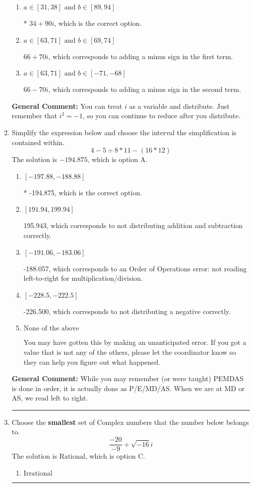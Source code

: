 \documentclass{extbook}[14pt]
\newcommand{\litem}[1]{\item #1

\rule{\textwidth}{0.4pt}}
\begin{document}
\begin{enumerate}
{\begin{enumerate}[label=\Alph*.]
 $34 - 90 i$, which corresponds to adding a minus sign in both terms.
\item \( a \in [31, 38] \text{ and } b \in [89, 94] \)

* $34 + 90 i$, which is the correct option.
\item \( a \in [63, 71] \text{ and } b \in [69, 74] \)

 $66 + 70 i$, which corresponds to adding a minus sign in the first term.
\item \( a \in [63, 71] \text{ and } b \in [-71, -68] \)

 $66 - 70 i$, which corresponds to adding a minus sign in the second term.
\end{enumerate}

\textbf{General Comment:} You can treat $i$ as a variable and distribute. Just remember that $i^2=-1$, so you can continue to reduce after you distribute.
}
\litem{
Simplify the expression below and choose the interval the simplification is contained within.
\[ 4 - 5 \div 8 * 11 - (16 * 12) \]
The solution is \( -194.875 \), which is option A.\begin{enumerate}[label=\Alph*.]
\item \( [-197.88, -188.88] \)

* -194.875, which is the correct option.
\item \( [191.94, 199.94] \)

 195.943, which corresponds to not distributing addition and subtraction correctly.
\item \( [-191.06, -183.06] \)

 -188.057, which corresponds to an Order of Operations error: not reading left-to-right for multiplication/division.
\item \( [-228.5, -222.5] \)

 -226.500, which corresponds to not distributing a negative correctly.
\item \( \text{None of the above} \)

 You may have gotten this by making an unanticipated error. If you got a value that is not any of the others, please let the coordinator know so they can help you figure out what happened.
\end{enumerate}

\textbf{General Comment:} While you may remember (or were taught) PEMDAS is done in order, it is actually done as P/E/MD/AS. When we are at MD or AS, we read left to right.
}
\litem{
Choose the \textbf{smallest} set of Complex numbers that the number below belongs to.
\[ \frac{-20}{-9}+\sqrt{-16}i \]
The solution is \( \text{Rational} \), which is option C.\begin{enumerate}[label=\Alph*.]
\item \( \text{Irrational} \)


\end{enumerate}}
\end{enumerate}
\end{document}
